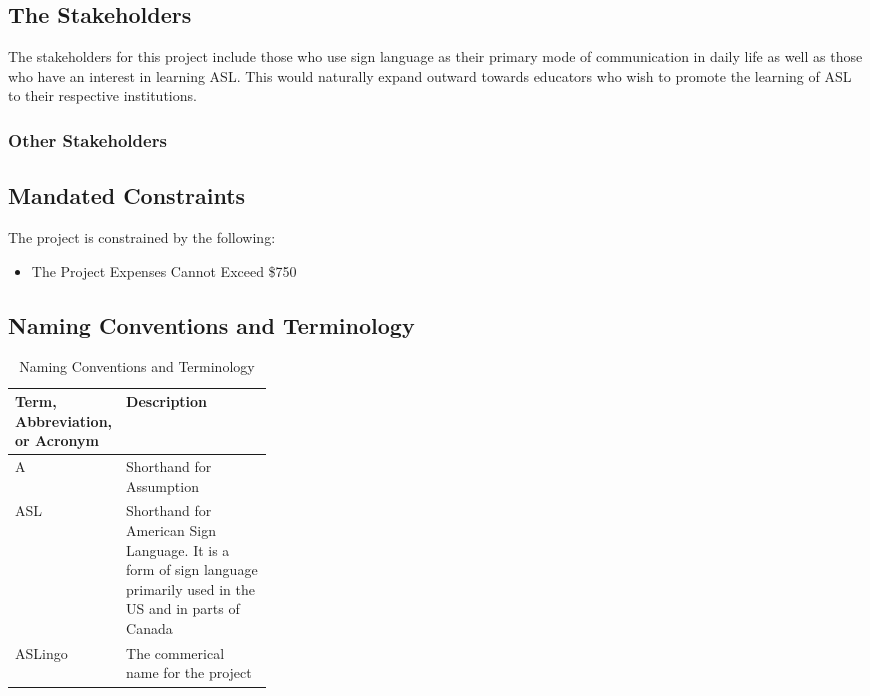 \documentclass[12pt, titlepage]{article}
\begin{document}
\subsection{The Stakeholders}

 The stakeholders for this project include those who use sign language as their primary mode of communication in daily life as well as those who have an interest in learning ASL. This would naturally expand outward towards educators who wish to promote the learning of ASL to their respective institutions. 



\subsubsection{Other Stakeholders}

\subsection{Mandated Constraints}

The project is constrained by the following:

\begin{itemize}
    \item The Project Expenses Cannot Exceed \$750
\end{itemize}

\subsection{Naming Conventions and Terminology}

\begin{table}
\caption{Naming Conventions and Terminology}
\noindent \begin{tabularx}{\textwidth}{|p{0.3\linewidth}|X|}
\toprule
\textbf{Term, Abbreviation, or Acronym} & \textbf{Description}\\
\midrule
A
& Shorthand for Assumption\\
\hline
ASL
& Shorthand for American Sign Language. It is a form of sign language primarily used in the US and in parts of Canada\\
\hline
ASLingo
& The commerical name for the project\\
\bottomrule
\end{tabularx}
\end{table}
\end{document}
